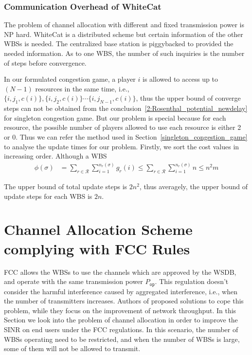 \documentclass[times]{ettauth}
\newcommand{\ie}{i.e., }
\theoremstyle{mytheoremstyle}
\theoremstyle{mytheoremstyle}
\theoremstyle{mytheoremstyle}
\begin{document}
\subsubsection{Communication Overhead of WhiteCat}

The problem of channel allocation with different and fixed transmission power is NP hard.
WhiteCat is a distributed scheme but certain information of the other WBSs is needed.
The centralized base station is piggybacked to provided the needed information.
As to one WBS, the number of such inquiries is the number of steps before convergence.

In our formulated congestion game, a player $i$ is allowed to access up to $(N-1)$ resources in the same time, \ie $\{i, j_1, c(i)\}, \{i, j_2, c(i)\} \cdots \{i, j_{N-1}, c(i)\}$, thus the upper bound of converge steps can not be obtained from the conclusion~\ref{2:Rosenthal_potential_newdelay} for singleton congestion game.
But our problem is special because for each resource, the possible number of players allowed to use each resource is either 2 or 0.
Thus we can refer the method used in Section~\ref{singleton_congestion_game} to analyse the update times for our problem.
Firstly, we sort the cost values in increasing order.
Although a WBS 
\begin{equation}
\label{2:Rosenthal_potential_newdelay}
\begin{split}
\phi(\sigma) 
& =\sum\limits^{}_{r\in \mathcal{R}} \sum\limits^{n_r(\sigma)}_{i=1} g_r(i) \leq \sum\limits^{}_{r\in \mathcal{R}} \sum\limits^{n_r(\sigma)}_{i=1} n \leq n^2m
\end{split}
\end{equation}

The upper bound of total update steps is $2n^2$, thus averagely, the upper bound of update steps for each WBS is $2n$.

\section{Channel Allocation Scheme complying with FCC Rules}
\label{schemeII}
FCC allows the WBSs to use the channels which are approved by the WSDB, and operate with the same transmission power $P_{\mathtt{op}}$.
This regulation doesn't consider the harmful interference caused by aggregated interference, \ie when the number of transmitters increases.
Authors of \cite{yang2013WiFiWSTVCapacity, gopalTCCN16} proposed solutions to cope this problem, while they focus on the improvement of network throughput.
In this Section we look into the problem of channel allocation in order to improve the SINR on end users under the FCC regulations.
In this scenario, the number of WBSs operating need to be restricted, and when the number of WBSs is large, some of them will not be allowed to transmit.
\end{document}
